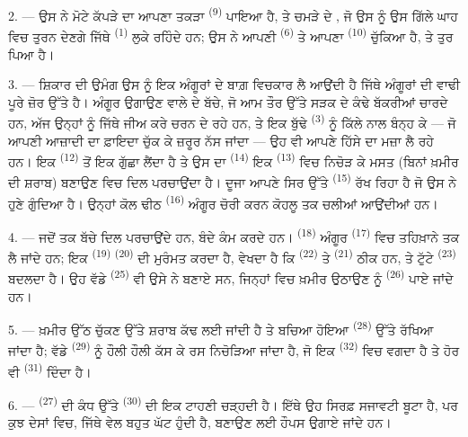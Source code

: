 2. --- ਉਸ ਨੇ ਮੋਟੇ ਕੱਪੜੇ ਦਾ ਆਪਣਾ ਤਕੜਾ  \textsuperscript{(9)}
ਪਾਇਆ ਹੈ, ਤੇ ਚਮੜੇ ਦੇ , ਜੋ ਉਸ ਨੂੰ ਉਸ ਗਿੱਲੇ ਘਾਹ ਵਿਚ ਤੁਰਨ ਦੇਣਗੇ ਜਿੱਥੇ
 \textsuperscript{(1)} ਲੁਕੇ ਰਹਿੰਦੇ ਹਨ; ਉਸ ਨੇ ਆਪਣੀ 
\textsuperscript{(6)} ਤੇ ਆਪਣਾ  \textsuperscript{(10)} ਚੁੱਕਿਆ
ਹੈ, ਤੇ ਤੁਰ ਪਿਆ ਹੈ।

3. --- ਸ਼ਿਕਾਰ ਦੀ ਉਮੰਗ ਉਸ ਨੂੰ ਇਕ ਅੰਗੂਰਾਂ ਦੇ ਬਾਗ਼ ਵਿਚਕਾਰ ਲੈ ਆਉਂਦੀ ਹੈ ਜਿੱਥੇ ਅੰਗੂਰਾਂ
ਦੀ ਵਾਢੀ ਪੂਰੇ ਜ਼ੋਰ ਉੱਤੇ ਹੈ। ਅੰਗੂਰ ਉਗਾਉਣ ਵਾਲੇ ਦੇ ਬੱਚੇ, ਜੋ ਆਮ ਤੌਰ ਉੱਤੇ ਸੜਕ ਦੇ ਕੰਢੇ
ਬੱਕਰੀਆਂ ਚਾਰਦੇ ਹਨ, ਅੱਜ ਉਨ੍ਹਾਂ ਨੂੰ ਜਿੱਥੇ ਜੀਅ ਕਰੇ ਚਰਨ ਦੇ ਰਹੇ ਹਨ, ਤੇ ਇਕ ਬੁੱਢੇ
 \textsuperscript{(3)} ਨੂੰ ਕਿੱਲੇ ਨਾਲ ਬੰਨ੍ਹ ਕੇ — ਜੋ ਆਪਣੀ ਆਜ਼ਾਦੀ ਦਾ
ਫ਼ਾਇਦਾ ਚੁੱਕ ਕੇ ਜ਼ਰੂਰ ਨੱਸ ਜਾਂਦਾ — ਉਹ ਵੀ ਆਪਣੇ ਹਿੱਸੇ ਦਾ ਮਜ਼ਾ ਲੈ ਰਹੇ ਹਨ। ਇਕ
 \textsuperscript{(12)} ਤੋਂ ਇਕ ਗੁੱਛਾ ਲੈਂਦਾ ਹੈ ਤੇ ਉਸ ਦਾ
 \textsuperscript{(14)} ਇਕ  \textsuperscript{(13)} ਵਿਚ ਨਿਚੋੜ
ਕੇ ਮਸਤ (ਬਿਨਾਂ ਖ਼ਮੀਰ ਦੀ ਸ਼ਰਾਬ) ਬਣਾਉਣ ਵਿਚ ਦਿਲ ਪਰਚਾਉਂਦਾ ਹੈ। ਦੂਜਾ ਆਪਣੇ ਸਿਰ ਉੱਤੇ
 \textsuperscript{(15)} ਰੱਖ ਰਿਹਾ ਹੈ ਜੋ ਉਸ ਨੇ ਹੁਣੇ ਗੁੰਦਿਆ ਹੈ।
ਉਨ੍ਹਾਂ ਕੋਲ ਢੀਠ  \textsuperscript{(16)} ਅੰਗੂਰ ਚੋਰੀ ਕਰਨ ਕੋਹਲੂ ਤਕ ਚਲੀਆਂ
ਆਉਂਦੀਆਂ ਹਨ।

4. --- ਜਦੋਂ ਤਕ ਬੱਚੇ ਦਿਲ ਪਰਚਾਉਂਦੇ ਹਨ, ਬੰਦੇ ਕੰਮ ਕਰਦੇ ਹਨ।
 \textsuperscript{(18)} ਅੰਗੂਰ 
\textsuperscript{(17)} ਵਿਚ ਤਹਿਖ਼ਾਨੇ ਤਕ ਲੈ ਜਾਂਦੇ ਹਨ; ਇਕ 
\textsuperscript{(19)}  \textsuperscript{(20)} ਦੀ ਮੁਰੰਮਤ ਕਰਦਾ ਹੈ,
ਵੇਖਦਾ ਹੈ ਕਿ  \textsuperscript{(22)} ਤੇ 
\textsuperscript{(21)} ਠੀਕ ਹਨ, ਤੇ ਟੁੱਟੇ  \textsuperscript{(23)} ਬਦਲਦਾ
ਹੈ। ਉਹ ਵੱਡੇ  \textsuperscript{(25)} ਵੀ ਉਸੇ ਨੇ ਬਣਾਏ ਸਨ, ਜਿਨ੍ਹਾਂ ਵਿਚ
ਖ਼ਮੀਰ ਉਠਾਉਣ ਨੂੰ  \textsuperscript{(26)} ਪਾਏ ਜਾਂਦੇ ਹਨ।

5. --- ਖ਼ਮੀਰ ਉੱਠ ਚੁੱਕਣ ਉੱਤੇ ਸ਼ਰਾਬ ਕੱਢ ਲਈ ਜਾਂਦੀ ਹੈ ਤੇ ਬਚਿਆ ਹੋਇਆ 
\textsuperscript{(28)} ਉੱਤੇ ਰੱਖਿਆ ਜਾਂਦਾ ਹੈ; ਵੱਡੇ  \textsuperscript{(29)}
ਨੂੰ ਹੌਲੀ ਹੌਲੀ ਕੱਸ ਕੇ ਰਸ ਨਿਚੋੜਿਆ ਜਾਂਦਾ ਹੈ, ਜੋ ਇਕ 
\textsuperscript{(32)} ਵਿਚ ਵਗਦਾ ਹੈ ਤੇ ਹੋਰ ਵੀ  \textsuperscript{(31)}
ਦਿੰਦਾ ਹੈ।

\VUsaut{6.0mm}
\VUsaut{3.4mm}

6. ---  \textsuperscript{(27)} ਦੀ ਕੰਧ ਉੱਤੇ 
\textsuperscript{(30)} ਦੀ ਇਕ ਟਾਹਣੀ ਚੜ੍ਹਦੀ ਹੈ। ਇੱਥੇ ਉਹ ਸਿਰਫ਼ ਸਜਾਵਟੀ ਬੂਟਾ ਹੈ, ਪਰ ਕੁਝ
ਦੇਸਾਂ ਵਿਚ, ਜਿੱਥੇ ਵੇਲ ਬਹੁਤ ਘੱਟ ਹੁੰਦੀ ਹੈ,  ਬਣਾਉਣ ਲਈ ਹੌਪਸ ਉਗਾਏ ਜਾਂਦੇ
ਹਨ।


